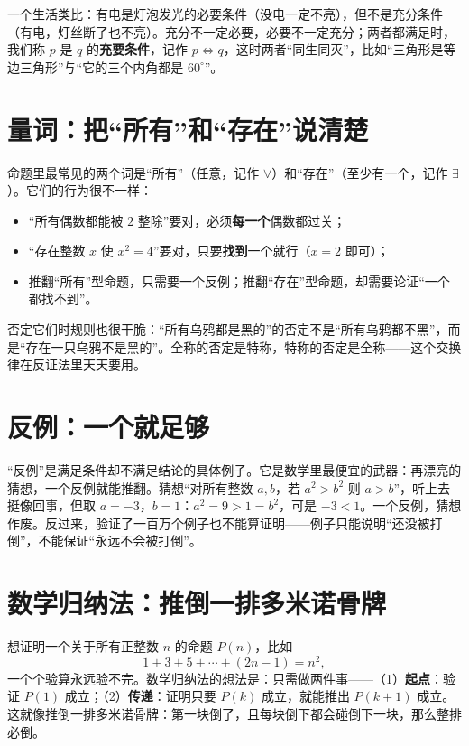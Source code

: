 一个生活类比：有电是灯泡发光的必要条件（没电一定不亮），但不是充分条件（有电，灯丝断了也不亮）。充分不一定必要，必要不一定充分；两者都满足时，我们称 $p$ 是 $q$ 的\textbf{充要条件}，记作 $p\Leftrightarrow q$，这时两者“同生同灭”，比如“三角形是等边三角形”与“它的三个内角都是 $60^\circ$”。

\section{量词：把“所有”和“存在”说清楚}

命题里最常见的两个词是“所有”（任意，记作 $\forall$）和“存在”（至少有一个，记作 $\exists$）。它们的行为很不一样：

\begin{itemize}
\item “所有偶数都能被 $2$ 整除”要对，必须\textbf{每一个}偶数都过关；
\item “存在整数 $x$ 使 $x^2=4$”要对，只要\textbf{找到}一个就行（$x=2$ 即可）；
\item 推翻“所有”型命题，只需要一个反例；推翻“存在”型命题，却需要论证“一个都找不到”。
\end{itemize}

否定它们时规则也很干脆：“所有乌鸦都是黑的”的否定不是“所有乌鸦都不黑”，而是“存在一只乌鸦不是黑的”。全称的否定是特称，特称的否定是全称——这个交换律在反证法里天天要用。

\section{反例：一个就足够}

“反例”是满足条件却不满足结论的具体例子。它是数学里最便宜的武器：再漂亮的猜想，一个反例就能推翻。猜想“对所有整数 $a,b$，若 $a^2>b^2$ 则 $a>b$”，听上去挺像回事，但取 $a=-3$，$b=1$：$a^2=9>1=b^2$，可是 $-3<1$。一个反例，猜想作废。反过来，验证了一百万个例子也不能算证明——例子只能说明“还没被打倒”，不能保证“永远不会被打倒”。

\section{数学归纳法：推倒一排多米诺骨牌}

想证明一个关于所有正整数 $n$ 的命题 $P(n)$，比如
\[1+3+5+\cdots+(2n-1)=n^2,\]
一个个验算永远验不完。数学归纳法的想法是：只需做两件事——（1）\textbf{起点}：验证 $P(1)$ 成立；（2）\textbf{传递}：证明只要 $P(k)$ 成立，就能推出 $P(k+1)$ 成立。这就像推倒一排多米诺骨牌：第一块倒了，且每块倒下都会碰倒下一块，那么整排必倒。

